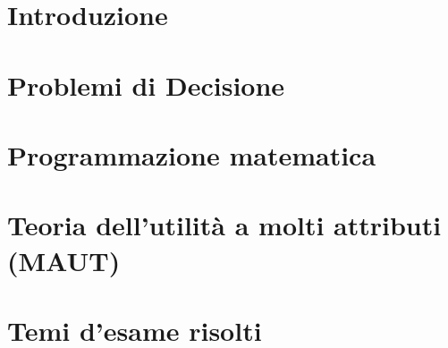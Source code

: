 \providecommand{\main}{.}








{\hypersetup{hidelinks}
	\tableofcontents  %
}

\chapter{Introduzione}


\chapter{Problemi di Decisione}

\chapter{Programmazione matematica}

\chapter{Teoria dell'utilità a molti attributi (MAUT)}


%

\appendix
\chapter{Temi d'esame risolti}

\clearpage

\clearpage

\clearpage




